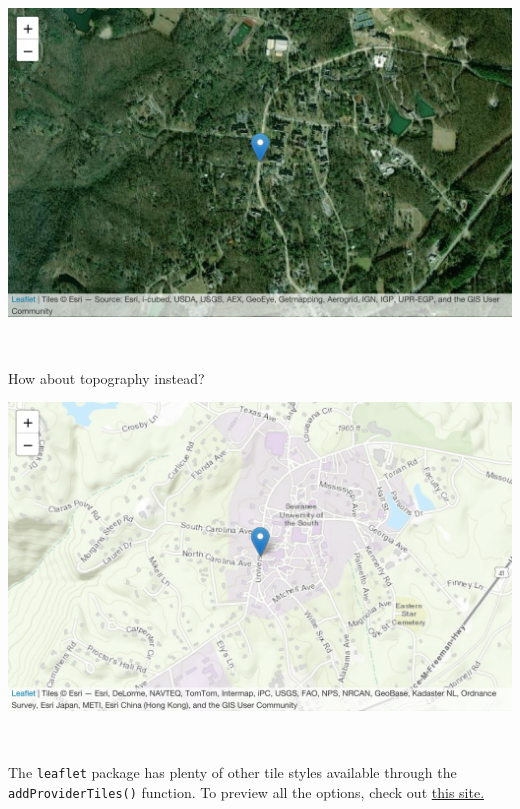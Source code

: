 \documentclass[
]{book}
\newenvironment{Shaded}{\begin{snugshade}}{\end{snugshade}}
\newcommand{\AttributeTok}[1]{\textcolor[rgb]{0.77,0.63,0.00}{#1}}
\newcommand{\FunctionTok}[1]{\textcolor[rgb]{0.00,0.00,0.00}{#1}}
\newcommand{\NormalTok}[1]{#1}
\newcommand{\SpecialCharTok}[1]{\textcolor[rgb]{0.00,0.00,0.00}{#1}}
\begin{document}
\includegraphics{figures/unnamed-chunk-215-1.pdf}

~

How about topography instead?

\begin{Shaded}
\end{Shaded}

\includegraphics{figures/unnamed-chunk-216-1.pdf}

~

The \texttt{leaflet} package has plenty of other tile styles available through the \texttt{addProviderTiles()} function. To preview all the options, check out \href{https://leaflet-extras.github.io/leaflet-providers/preview/}{this site.}
\end{document}
